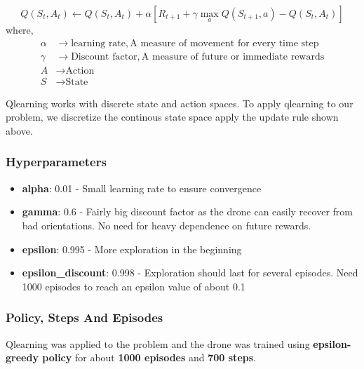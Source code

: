 \documentclass[12pt]{article}
\begin{document}
\begin{equation}
  Q(S_t,A_t) \leftarrow Q(S_t,A_t) + \alpha[R_{t+1}+\gamma \max\limits_a Q(S_{t+1},a)- Q(S_t,A_t)]
\end{equation}
where, 
\begin{align}
  \alpha &\rightarrow  \text{learning rate}, \text{A measure of movement for every time step}     \nonumber  \\
  \gamma &\rightarrow  \text{Discount factor}, \text{A measure of  future or immediate rewards}  \nonumber \\
  A      &\rightarrow \text{Action}  \nonumber \\
  S      &\rightarrow \text{State} \nonumber
\end{align}

Qlearning works with discrete state and action spaces. To apply qlearning to our problem, we discretize the continous state space 
apply the update rule shown above.

\subsubsection{Hyperparameters}
\begin{itemize}
  \item \textbf{alpha}: 0.01 - Small learning rate to ensure convergence
  \item \textbf{gamma}: 0.6 - Fairly big discount factor as the drone can easily recover from bad orientations. 
    No need for heavy dependence on future rewards.
  \item \textbf{epsilon}: 0.995 - More exploration in the beginning  
  \item \textbf{epsilon\_discount}: 0.998  - Exploration should last for several episodes. Need 1000 episodes to reach an epsilon value 
    of about 0.1
\end{itemize}

\subsubsection{Policy, Steps  And Episodes}
Qlearning was applied to the problem and the drone was trained using \textbf{epsilon-greedy policy} for about \textbf{1000 episodes} and 
\textbf{700 steps}.
\end{document}
